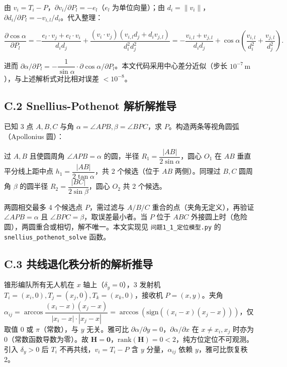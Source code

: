 \documentclass[12pt,a4paper]{ctexart}
\newcommand{\unit}[1]{\ensuremath{\,\mathrm{#1}}}
\begin{document}
由 $v_i=T_i-P$，$\partial v_i/\partial P_l=-e_l$（$e_l$ 为单位向量）；由 $d_i=\|v_i\|$，$\partial d_i/\partial P_l=-v_{i,l}/d_i$。代入整理：

\begin{equation}
\frac{\partial\cos\alpha}{\partial P_l}=-\frac{e_l\cdot v_j+e_l\cdot v_i}{d_i d_j}+\frac{(v_i\cdot v_j)(v_{i,l}d_j+d_i v_{j,l})}{d_i^2 d_j^2}=-\frac{v_{i,l}+v_{j,l}}{d_i d_j}+\cos\alpha\!\left(\frac{v_{i,l}}{d_i^2}+\frac{v_{j,l}}{d_j^2}\right).
\end{equation}

进而 $\partial\alpha/\partial P_l=-\dfrac{1}{\sin\alpha}\cdot\partial\cos\alpha/\partial P_l$。本文代码采用中心差分近似（步长 $10^{-7}\unit{m}$），与上述解析式对比相对误差 $<10^{-8}$。

\subsection*{C.2 Snellius-Pothenot 解析解推导}

已知 3 点 $A,B,C$ 与角 $\alpha=\angle APB,\beta=\angle BPC$，求 $P$。构造两条等视角圆弧（Apollonius 圆）：

过 $A,B$ 且使圆周角 $\angle APB=\alpha$ 的圆，半径 $R_1=\dfrac{|AB|}{2\sin\alpha}$，圆心 $O_1$ 在 $AB$ 垂直平分线上距中点 $h_1=\dfrac{|AB|}{2\tan\alpha}$，共 2 个候选（位于 $AB$ 两侧）。同理过 $B,C$ 圆周角 $\beta$ 的圆半径 $R_2=\dfrac{|BC|}{2\sin\beta}$，圆心 $O_2$ 共 2 个候选。

两圆相交最多 4 个候选点 $P$，需过滤与 $A/B/C$ 重合的点（夹角无定义），再验证 $\angle APB=\alpha$ 且 $\angle BPC=\beta$，取误差最小者。当 $P$ 位于 $ABC$ 外接圆上时（危险圆），两圆重合或相切，解不唯一。本文实现见 \texttt{问题1\_1\_定位模型.py} 的 \texttt{snellius\_pothenot\_solve} 函数。

\subsection*{C.3 共线退化秩分析的解析推导}

锥形编队所有无人机在 $x$ 轴上（$\delta_y=0$），3 发射机 $T_i=(x_i,0),T_j=(x_j,0),T_k=(x_k,0)$，接收机 $P=(x,y)$。夹角 $\alpha_{ij}=\arccos\dfrac{(x_i-x)(x_j-x)}{|x_i-x|\cdot|x_j-x|}=\arccos(\text{sign}((x_i-x)(x_j-x)))$，仅取值 $0$ 或 $\pi$（常数），与 $y$ 无关。雅可比 $\partial\alpha/\partial y=0$，$\partial\alpha/\partial x$ 在 $x\neq x_i,x_j$ 时亦为 $0$（常数函数导数为零）。故 $\mathbf{H}=\mathbf{0}$，$\text{rank}(\mathbf{H})=0<2$，纯方位定位不可观测。引入 $\delta_y>0$ 后 $T_i$ 不再共线，$v_i=T_i-P$ 含 $y$ 分量，$\alpha_{ij}$ 依赖 $y$，雅可比恢复秩 2。
\end{document}
